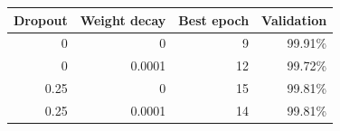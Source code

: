 \begin{center}\begin{tabular}{rrrr}
\toprule
Dropout & Weight decay & Best epoch & Validation \\\midrule
0 & 0 & 9 & 99.91\% \\
0 & 0.0001 & 12 & 99.72\% \\
0.25 & 0 & 15 & 99.81\% \\
0.25 & 0.0001 & 14 & 99.81\% \\
\bottomrule\end{tabular}\end{center}
